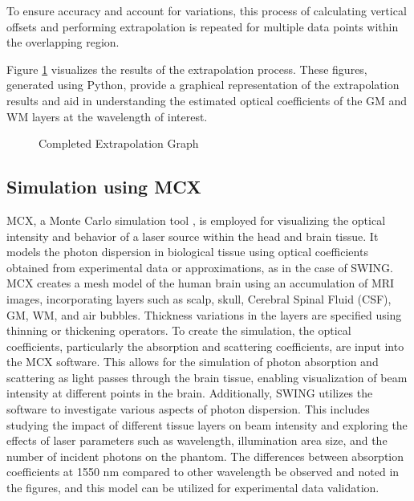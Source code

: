 \documentclass[journal,twoside,web]{ieeecolor}
\begin{document}
To ensure accuracy and account for variations, this process of calculating vertical offsets and performing extrapolation is repeated for 
multiple data points within the overlapping region.

Figure \ref{fig:Extrapolation} visualizes the results of the extrapolation process.  These figures, generated using Python, provide a graphical representation of the 
extrapolation results and aid in understanding the estimated optical coefficients of the GM and WM layers at the wavelength of interest.
\begin{figure}[htb]
    \caption{\label{fig:Extrapolation} Completed Extrapolation Graph}
\end{figure}

\subsection{Simulation using MCX}
MCX, a Monte Carlo simulation tool \cite{b6}, is employed for visualizing the optical intensity and behavior of a laser source within the head and brain tissue. 
It models the photon dispersion in biological tissue using optical coefficients obtained from experimental data or approximations, as in the case of SWING. 
MCX creates a mesh model of the human brain using an accumulation of MRI images, incorporating layers such as scalp, skull, Cerebral Spinal Fluid (CSF), GM, WM, 
and air bubbles. Thickness variations in the layers are specified using thinning or thickening operators. To create the simulation, the optical coefficients, 
particularly the absorption and scattering coefficients, are input into the MCX software. This allows for the simulation of photon absorption and scattering as 
light passes through the brain tissue, enabling visualization of beam intensity at different points in the brain. Additionally, SWING utilizes the software to 
investigate various aspects of photon dispersion. This includes studying the impact of different tissue layers on beam intensity and exploring the effects of 
laser parameters such as wavelength, illumination area size, and the number of incident photons on the phantom. The differences between absorption coefficients at 
1550 nm compared to other wavelength be observed and noted in the figures, and this model can be utilized for experimental data validation.
\end{document}
